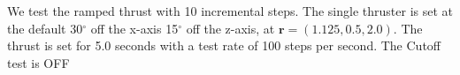 We test the ramped thrust with 10 incremental steps. The single thruster is set at the default 30$^\circ$ off the x-axis 15$^\circ$ off the z-axis, at $\bm r = \left(1.125,0.5,2.0\right)$. The thrust is set for 5.0 seconds with a test rate of 100 steps per second. The Cutoff test is OFF